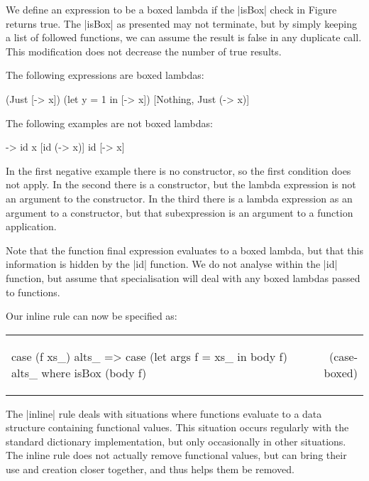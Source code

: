 \documentclass[preprint]{sigplanconf}
\newcommand{\simp}[2]{\vspace{-7mm} #2 & (#1) \\}
\newenvironment{simplify}
    {\noindent
     \begin{flushright}
     \begin{tabular}{p{6.5cm}r}
    }
    {\end{tabular}
     \vspace{-7mm}
     \end{flushright}
    }
\begin{document}
We define an expression to be a boxed lambda if the |isBox| check in Figure \label{fig:boxed_lambda} returns true. The |isBox| as presented may not terminate, but by simply keeping a list of followed functions, we can assume the result is false in any duplicate call. This modification does not decrease the number of true results.

\begin{example}
The following expressions are boxed lambdas:

\ignore\begin{code}
[\x -> x]
(Just [\x -> x])
(let y = 1 in [\x -> x])
[Nothing, Just (\x -> x)]
\end{code}

The following examples are not boxed lambdas:

\ignore\begin{code}
\x -> id x
[id (\x -> x)]
id [\x -> x]
\end{code}

In the first negative example there is no constructor, so the first condition does not apply. In the second there is a constructor, but the lambda expression is not an argument to the constructor. In the third there is a lambda expression as an argument to a constructor, but that subexpression is an argument to a function application.

Note that the function final expression evaluates to a boxed lambda, but that this information is hidden by the |id| function. We do not analyse within the |id| function, but assume that specialisation will deal with any boxed lambdas passed to functions.
\end{example}

Our inline rule can now be specified as:

\begin{simplify}

\simp{case-boxed}{
\ignore\begin{code}
case (f xs_) alts_
    => case (let args f = xs_ in body f) alts_
    where isBox (body f)
\end{code}}

\end{simplify}

The |inline| rule deals with situations where functions evaluate to a data structure containing functional values. This situation occurs regularly with the standard dictionary implementation, but only occasionally in other situations. The inline rule does not actually remove functional values, but can bring their use and creation closer together, and thus helps them be removed.
\end{document}
